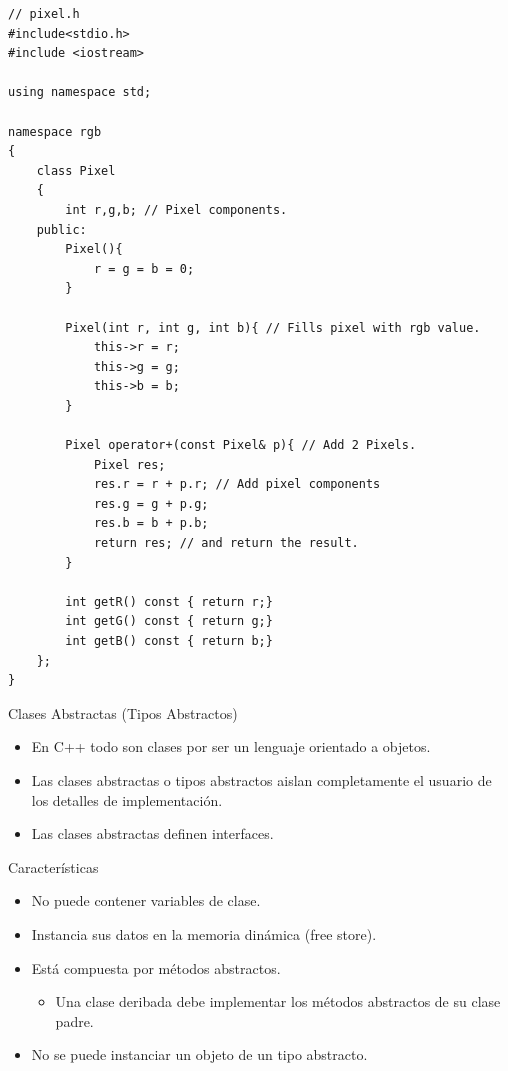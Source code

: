 \documentclass[aspectratio=169,presentation]{beamer}
\begin{document}
\begin{frame}[label={sec:org2ae5f3c},fragile]{}
 \begin{verbatim}
// pixel.h
#include<stdio.h>
#include <iostream>

using namespace std;

namespace rgb
{
	class Pixel
	{
		int r,g,b; // Pixel components.
	public:		
		Pixel(){
			r = g = b = 0;
		}
		
		Pixel(int r, int g, int b){ // Fills pixel with rgb value.
			this->r = r;
			this->g = g;
			this->b = b;
		}
				
		Pixel operator+(const Pixel& p){ // Add 2 Pixels.
			Pixel res;
			res.r = r + p.r; // Add pixel components
			res.g = g + p.g;
			res.b = b + p.b;
			return res; // and return the result.
		}

		int getR() const { return r;}
		int getG() const { return g;}
		int getB() const { return b;}
	};
}
\end{verbatim}
\end{frame}
\begin{frame}[label={sec:org72deefc}]{Clases Abstractas (Tipos Abstractos)}
\begin{itemize}
\item En C++ todo son clases por ser un lenguaje orientado a objetos.
\item Las clases abstractas o tipos abstractos aislan completamente el
usuario de los detalles de implementación.
\item Las clases abstractas definen interfaces.
\end{itemize}
\begin{block}{Características}
\begin{itemize}
\item No puede contener variables de clase.
\item Instancia sus datos en la memoria dinámica (free store).
\item Está compuesta por métodos abstractos.
\begin{itemize}
\item Una clase deribada debe implementar los métodos abstractos de su clase padre.
\end{itemize}
\item No se puede instanciar un objeto de un tipo abstracto.
\end{itemize}
\end{block}
\end{frame}
\end{document}
